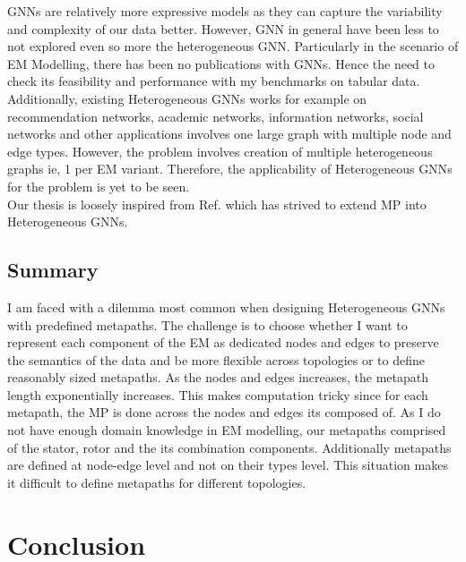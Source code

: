 \documentclass{report} %
\begin{document}
\ac{GNN}s are relatively more expressive models as they can capture the variability and complexity of our data better.
However, \ac{GNN} in general have been less to not explored even so more the heterogeneous \ac{GNN}.
Particularly in the scenario of \ac{EM} Modelling, there has been no publications with \ac{GNN}s.
Hence the need to check its feasibility and performance with my benchmarks on tabular data.
Additionally, existing Heterogeneous \ac{GNN}s works for example on recommendation networks, academic networks, information networks, social networks and other applications 
involves one large graph with multiple node and edge types. 
However, the problem involves creation of multiple heterogeneous graphs ie, 1 per \ac{EM} variant. Therefore, the applicability of Heterogeneous \ac{GNN}s for the 
problem is yet to be seen.\\
Our thesis is loosely inspired from Ref. \cite{ML HGNN-2023} which has strived to extend \ac{MP} into Heterogeneous \ac{GNN}s.

\section{Summary}\label{sec:EM Heterogeneous GNN Discussion}
I am faced with a dilemma most common when designing Heterogeneous \ac{GNN}s with predefined metapaths.
The challenge is to choose whether I want to represent each component of the \ac{EM} as dedicated nodes and edges to preserve the semantics of the data and be more flexible 
across topologies or to define reasonably sized metapaths. As the nodes and edges increases, the metapath length exponentially increases.
This makes computation tricky since for each metapath, the \ac{MP} is done across the nodes and edges its composed of.
As I do not have enough domain knowledge in \ac{EM} modelling, our metapaths comprised of the stator, rotor and the its combination components.
Additionally metapaths are defined at node-edge level and not on their types level. This situation makes it difficult to define metapaths for different topologies.

\chapter{Conclusion}
\end{document}
